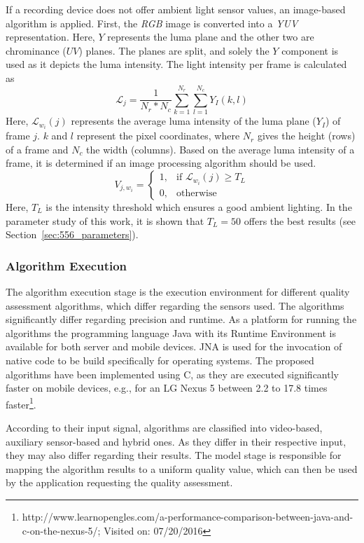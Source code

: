 If a recording device does not offer ambient light sensor values, an image-based algorithm is applied.
First, the \textit{RGB} image is converted into a \textit{YUV} representation. 
Here, $Y$ represents the luma plane and the other two are chrominance ($UV$) planes. 
The planes are split, and solely the $Y$ component is used as it depicts the luma intensity. 
The light intensity per frame is calculated as
\begin{equation}\label{eq:554_lumaip}
\mathcal{L}_{j} =\frac{1}{N_r*N_c} \displaystyle\sum_{k=1}^{N_r} \displaystyle\sum_{l=1}^{N_c} Y_{I}(k,l)
\end{equation}
Here, $\mathcal{L}_{w_i}(j)$ represents the average luma intensity of the luma plane ($Y_I$) of frame $j$.
$k$ and $l$ represent the pixel coordinates, where $N_r$ gives the height (rows) of a frame and $N_c$ the width (columns).
Based on the average luma intensity of a frame, it is determined if an image processing algorithm should be used.
\begin{equation}
V_{j,w_i} = \begin{cases}
1,& \text{if } \mathcal{L}_{w_i}(j) \geq T_{L}\\
0,              & \text{otherwise}
\end{cases}
\end{equation}
Here, $T_{L}$ is the intensity threshold which ensures a good ambient lighting. 
In the parameter study of this work, it is shown that $T_{L} = 50$ offers the best results (see Section~\ref{sec:556_parameters}).
\subsubsection{Algorithm Execution}
\label{554:sec_Algorithm_Execution}
The algorithm execution stage is the execution environment for different quality assessment algorithms, which differ regarding the sensors used.
The algorithms significantly differ regarding precision and runtime.
As a platform for running the algorithms the programming language Java with its Runtime Environment is available for both server and mobile devices.
\ac{JNA} is used for the invocation of native code to be build specifically for operating systems.
The proposed algorithms have been implemented using C, as they are executed significantly faster on mobile devices, e.g., for an LG Nexus 5 between 2.2 to 17.8 times faster\footnote{http://www.learnopengles.com/a-performance-comparison-between-java-and-c-on-the-nexus-5/; Visited on: 07/20/2016}.

According to their input signal, algorithms are classified into video-based, auxiliary sensor-based and hybrid ones. 
As they differ in their respective input, they may also differ regarding their results.
The model stage is responsible for mapping the algorithm results to a uniform quality value, which can then be used by the application requesting the quality assessment.
